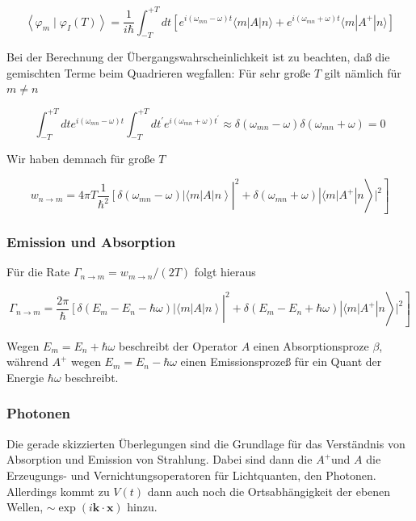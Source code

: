 \documentclass[10pt, letterpaper]{article}
\begin{document}
$$
\left\langle\varphi_{m} \mid \varphi_{I}(T)\right\rangle=\frac{1}{i \hbar} \int_{-T}^{+T} d t\left[e^{i\left(\omega_{m n}-\omega\right) t}\langle m| A|n\rangle+e^{i\left(\omega_{m n}+\omega\right) t}\langle m| A^{+}|n\rangle\right]
$$

Bei der Berechnung der Übergangswahrscheinlichkeit ist zu beachten, daß die gemischten Terme beim Quadrieren wegfallen: Für sehr große $T$ gilt nämlich für $m \neq n$

$$
\int_{-T}^{+T} d t e^{i\left(\omega_{m n}-\omega\right) t} \int_{-T}^{+T} d t^{\prime} e^{i\left(\omega_{m n}+\omega\right) t^{\prime}} \approx \delta\left(\omega_{m n}-\omega\right) \delta\left(\omega_{m n}+\omega\right)=0
$$

Wir haben demnach für große $T$

$$
\left.\left.w_{n \rightarrow m}=\left.4 \pi T \frac{1}{\hbar^{2}}\left[\delta\left(\omega_{m n}-\omega\right)|\langle m| A| n\right\rangle\right|^{2}+\delta\left(\omega_{m n}+\omega\right)\left|\langle m| A^{+}\right| n\right\rangle\left.\right|^{2}\right]
$$

\subsubsection*{Emission und Absorption}
Für die Rate $\Gamma_{n \rightarrow m}=w_{m \rightarrow n} /(2 T)$ folgt hieraus

$$
\left.\left.\Gamma_{n \rightarrow m}=\left.\frac{2 \pi}{\hbar}\left[\delta\left(E_{m}-E_{n}-\hbar \omega\right)|\langle m| A| n\right\rangle\right|^{2}+\delta\left(E_{m}-E_{n}+\hbar \omega\right)\left|\langle m| A^{+}\right| n\right\rangle\left.\right|^{2}\right]
$$

Wegen $E_{m}=E_{n}+\hbar \omega$ beschreibt der Operator $A$ einen Absorptionsproze $\beta$, während $A^{+}$ wegen $E_{m}=E_{n}-\hbar \omega$ einen Emissionsprozeß für ein Quant der Energie $\hbar \omega$ beschreibt.

\subsubsection*{Photonen}
Die gerade skizzierten Überlegungen sind die Grundlage für das Verständnis von Absorption und Emission von Strahlung. Dabei sind dann die $A^{+}$und $A$ die Erzeugungs- und Vernichtungsoperatoren für Lichtquanten, den Photonen. Allerdings kommt zu $V(t)$ dann auch noch die Ortsabhängigkeit der ebenen Wellen, $\sim \exp (i \mathbf{k} \cdot \mathbf{x})$ hinzu.
\end{document}
